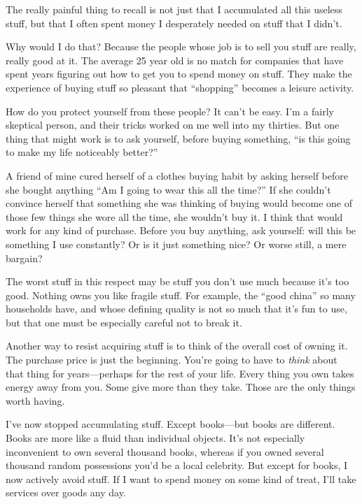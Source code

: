 \documentclass[12pt]{book}
\begin{document}
The really painful thing to recall is not just that I accumulated all
this useless stuff, but that I often spent money I desperately needed on
stuff that I didn't.

Why would I do that? Because the people whose job is to sell you stuff
are really, really good at it. The average 25 year old is no match for
companies that have spent years figuring out how to get you to spend
money on stuff. They make the experience of buying stuff so pleasant
that ``shopping'' becomes a leisure activity.

How do you protect yourself from these people? It can't be easy. I'm a
fairly skeptical person, and their tricks worked on me well into my
thirties. But one thing that might work is to ask yourself, before
buying something, ``is this going to make my life noticeably better?''

A friend of mine cured herself of a clothes buying habit by asking
herself before she bought anything ``Am I going to wear this all the
time?'' If she couldn't convince herself that something she was thinking
of buying would become one of those few things she wore all the time,
she wouldn't buy it. I think that would work for any kind of purchase.
Before you buy anything, ask yourself: will this be something I use
constantly? Or is it just something nice? Or worse still, a mere
bargain?

The worst stuff in this respect may be stuff you don't use much because
it's too good. Nothing owns you like fragile stuff. For example, the
``good china'' so many households have, and whose defining quality is
not so much that it's fun to use, but that one must be especially
careful not to break it.

Another way to resist acquiring stuff is to think of the overall cost of
owning it. The purchase price is just the beginning. You're going to
have to \emph{think} about that thing for years---perhaps for the rest
of your life. Every thing you own takes energy away from you. Some give
more than they take. Those are the only things worth having.

I've now stopped accumulating stuff. Except books---but books are
different. Books are more like a fluid than individual objects. It's not
especially inconvenient to own several thousand books, whereas if you
owned several thousand random possessions you'd be a local celebrity.
But except for books, I now actively avoid stuff. If I want to spend
money on some kind of treat, I'll take services over goods any day.
\end{document}
